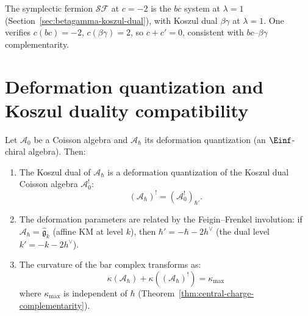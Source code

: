 \begin{remark}
\label{rem:sf-koszul-dual}
The symplectic fermion $\mathcal{SF}$ at $c = -2$ is the $bc$ system at $\lambda = 1$ (Section~\ref{sec:betagamma-koszul-dual}), with Koszul dual $\beta\gamma$ at $\lambda = 1$.  One verifies $c(bc) = -2$, $c(\beta\gamma) = 2$, so $c + c' = 0$, consistent with $bc$--$\beta\gamma$ complementarity.
\end{remark}


\section{Deformation quantization and Koszul duality compatibility}
\label{sec:dq-koszul-compatibility}

\begin{theorem}
\label{thm:dq-koszul-compatible}
Let $\mathcal{A}_0$ be a Coisson algebra and
$\mathcal{A}_\hbar$ its deformation quantization (an $\Einf$-chiral
algebra).  Then:
\begin{enumerate}
\item The Koszul dual of $\mathcal{A}_\hbar$ is a deformation
quantization of the Koszul dual Coisson algebra $\mathcal{A}_0^!$:
\[
(\mathcal{A}_\hbar)^! = (\mathcal{A}_0^!)_{\hbar'}.
\]
\item The deformation parameters are related by the Feigin--Frenkel
involution: if $\mathcal{A}_\hbar = \widehat{\mathfrak{g}}_k$
(affine KM at level $k$), then $\hbar' = -\hbar - 2h^\vee$
(the dual level $k' = -k - 2h^\vee$).
\item The curvature of the bar complex transforms as:
\[
\kappa(\mathcal{A}_\hbar) + \kappa((\mathcal{A}_\hbar)^!)
= \kappa_{\mathrm{max}}
\]
where $\kappa_{\mathrm{max}}$ is independent of $\hbar$
(Theorem~\ref{thm:central-charge-complementarity}).
\end{enumerate}
\end{theorem}

